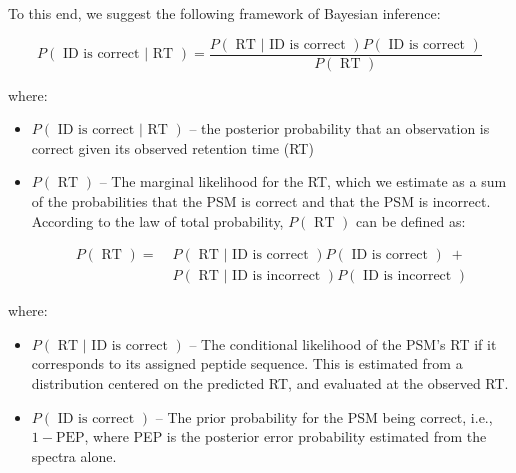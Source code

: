 \begin{spacing}{1.55}
To this end, we suggest the following framework of Bayesian inference:

\[ P(\mbox{ ID is correct }|\mbox{ RT }) = \frac{P(\mbox{ RT }|\mbox{ ID is correct })P(\mbox{ ID is correct })}{P(\mbox{ RT })} \]

where:

\vspace{-4mm}

\begin{itemize}%
\item $P(\mbox{ ID is correct }|\mbox{ RT })$ -- the posterior probability that an observation is correct given its observed retention time (RT)

\item $P(\mbox{ RT })$ -- The marginal likelihood for the RT, which we estimate as a sum of the probabilities that the PSM is correct and that the PSM is incorrect. According to the law of total probability, $P(\mbox{ RT })$ can be defined as:

\vspace{-14mm}

\begin{align}
P(\mbox{ RT }) =\;&P(\mbox{ RT }|\mbox{ ID is correct })P(\mbox{ ID is correct })\;+ \nonumber \\
                 &P(\mbox{ RT }|\mbox{ ID is incorrect })P(\mbox{ ID is incorrect }) \nonumber
\end{align}

\vspace{-8mm}
\end{itemize}

\indent where:

\begin{itemize}
\vspace{-4mm}

%
\item $P(\mbox{ RT }|\mbox{ ID is correct })$ -- The conditional likelihood of the PSM's RT if it corresponds to its assigned peptide sequence. This is estimated from a distribution centered on the predicted RT, and evaluated at the observed RT.

\item $P(\mbox{ ID is correct })$ -- The prior probability for the PSM being correct, i.e., $1- \mbox{PEP}$, where PEP is the posterior error probability estimated from the spectra alone. 


\end{itemize}
\end{spacing}
